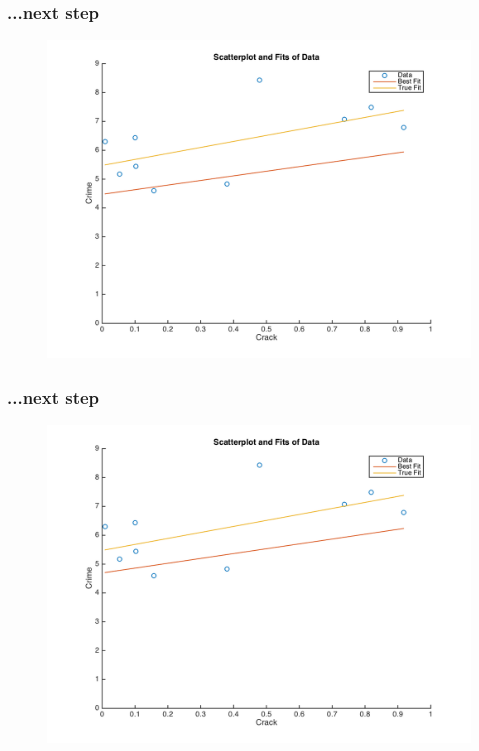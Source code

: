 \documentclass{beamer}
\begin{document}
\begin{frame}
\frametitle[alignment=center]{...next step}
\begin{figure}
\centering
\includegraphics[scale=0.5]{Newton_OLS_Figure_8.png}
\end{figure}
\end{frame}

\begin{frame}
\frametitle[alignment=center]{...next step}
\begin{figure}
\centering
\includegraphics[scale=0.5]{Newton_OLS_Figure_9.png}
\end{figure}
\end{frame}
\end{document}
